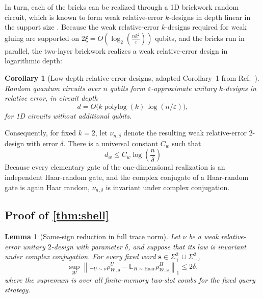 \documentclass[
    aps,
    superscriptaddress,
    onecolumn,
    10pt,
    prx,
    nofootinbib
]{revtex4-2}
\newtheorem{lemma}{Lemma}
\newtheorem{corollary}{Corollary}
\theoremstyle{namedstatement}
\theoremstyle{plain}
\begin{document}
In turn, each of the bricks can be realized through a 1D brickwork random circuit, which is known to form weak relative-error $k$-designs in depth linear in the support size \cite{chen2024incompressibilityspectralgapsrandom}. Because the weak relative-error $k$-designs required for weak gluing are supported on $2\xi=O( \log_2\left(\frac{nk^2}{\varepsilon}\right))$ qubits, and the bricks run in parallel, the two-layer brickwork realizes a weak relative-error design in logarithmic depth:  
\begin{corollary}[Low-depth relative-error designs, adapted Corollary~1 from Ref.~\cite{SchusterHaferkampHuang2025}]
\label{thm:shh-lowdepth}
Random quantum circuits over $n$ qubits form $\varepsilon$-approximate unitary $k$-designs in relative error, in circuit depth
\begin{equation}
d=O\!\bigl(k\operatorname{polylog}(k)\,\log(n/\varepsilon)\bigr),
\label{eq:shh-depth}
\end{equation}
for 1D circuits without additional qubits.
\end{corollary}
Consequently, for fixed $k=2$, let $\nu_{n,\delta}$ denote the resulting weak relative-error $2$-design with error $\delta$. There is a universal constant $C_w$ such that
\begin{equation}
    d_w \leq C_w\log(\frac{n}{\delta})
\end{equation}
Because every elementary gate of the one-dimensional realization is an independent Haar-random gate, and the complex conjugate of a Haar-random gate is again Haar random, $\nu_{n,\delta}$ is invariant under complex conjugation.



\newpage


\subsection{Proof of \cref{thm:shell}}
\label{app:proof-strong-two-shell}
\iffalse
\begin{lemma}[Same-sign reduction in full trace norm]
\label{lem:same-sign-interface}
Let $\nu$ be a weak relative-error unitary $2$-design with parameter $\delta$, and suppose that its law is invariant under complex conjugation. For every fixed word $\boldsymbol{s}\in\Sigma_+^2\cup\Sigma_-^2$,
\begin{equation}
\sup_{\mathcal W}
\left\|
\mathbb E_{U\sim\nu}\rho_{\mathcal W,\boldsymbol{s}}^U
-
\mathbb E_{H\sim\mathrm{Haar}}\rho_{\mathcal W,\boldsymbol{s}}^H
\right\|_1
\le 2\delta,
\label{eq:same-sign-full-error}
\end{equation}
where the supremum is over all finite-memory two-slot combs for the fixed query strategy.
\end{lemma}
\end{document}
